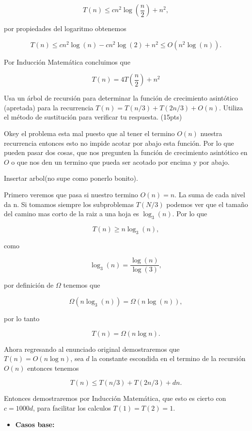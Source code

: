\documentclass[answers,11pt]{exam}
\begin{document}
\begin{questions}
\begin{itemize}
    \[T(n) \leq cn^2\log\left(\frac{n}{2}\right) + n^2,\]

    por propiedades del logaritmo obtenemos

    \[T(n) \leq cn^2\log(n) - cn^2\log(2) + n^2 \leq O(n^2\log(n)).\]
\end{itemize}

Por Inducción Matemática concluimos que

\[T(n) = 4T\left( \frac{n}{2} \right) + n^2\]

\question 
Usa un \'arbol de recursi\'on para determinar la funci\'on de crecimiento asint\'otico (apretada) para la recurrencia $T(n) = T(n/3) + T(2n/3) + O(n)$. Utiliza el m\'etodo de sustituci\'on para verificar tu respuesta. (15pts)

Okey el problema esta mal puesto que al tener el termino $O(n)$ nuestra recurrencia entonces esto no impide acotar por abajo esta función. Por lo que pueden pasar dos cosas, que nos pregunten la función de crecimiento asintótico en $O$ o que nos den un termino que pueda ser acotado por encima y por abajo.

Insertar arbol(no supe como ponerlo bonito).

Primero veremos que pasa si nuestro termino $O(n) = n$. La suma de cada nivel da n. Si tomamos siempre los subproblemas $T(N/3)$ podemos ver que el tamaño del camino mas corto de la raiz a una hoja es $\log_3(n)$. Por lo que

\[T(n) \geq n\log_3(n),\]

como

\[\log_3(n) = \frac{\log(n)}{\log(3)},\]

por definición de $\Omega$ tenemos que

\[\Omega(n\log_3(n)) = \Omega(n\log(n)),\]

por lo tanto

\[T(n) = \Omega(n\log n).\]

Ahora regresando al enunciado original demostraremos que $T(n) = O(n\log n)$, sea $d$ la constante escondida en el termino de la recursión $O(n)$ entonces tenemos

\[T(n) \leq T(n/3) + T(2n/3) + dn.\]

Entonces demostraremos por Inducción Matemática, que esto es cierto con $c = 1000d$, para facilitar los calculos $T(1) = T(2) = 1$.

\begin{itemize}
    \item \textbf{Casos base:}
        

\end{itemize}
\end{questions}
\end{document}
